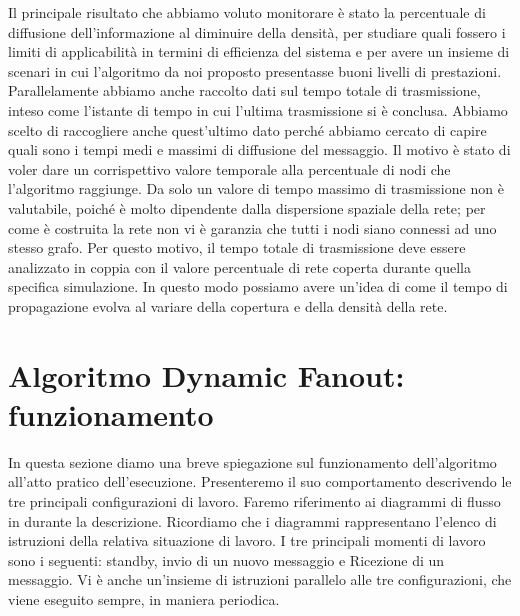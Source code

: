 Il principale risultato che abbiamo voluto monitorare è stato la percentuale di diffusione dell'informazione al diminuire della densità, per studiare quali fossero i limiti di applicabilità in termini di efficienza del sistema e per avere un insieme di scenari in cui l'algoritmo da noi proposto presentasse buoni livelli di prestazioni. Parallelamente abbiamo anche raccolto dati sul tempo totale di trasmissione, inteso come l'istante di tempo in cui l'ultima trasmissione si è conclusa. Abbiamo scelto di raccogliere anche quest'ultimo dato perché abbiamo cercato di capire quali sono i tempi medi e massimi di diffusione del messaggio. Il motivo è stato di voler dare un corrispettivo valore temporale alla percentuale di nodi che l'algoritmo raggiunge. Da solo un valore di tempo massimo di trasmissione non è valutabile, poiché è molto dipendente dalla dispersione spaziale della rete; per come è costruita la rete non vi è garanzia che tutti i nodi siano connessi ad uno stesso grafo. Per questo motivo, il tempo totale di trasmissione deve essere analizzato in coppia con il valore percentuale di rete coperta durante quella specifica simulazione. In questo modo possiamo avere un'idea di come il tempo di propagazione evolva al variare della copertura e della densità della rete.
\bigskip

\section{Algoritmo Dynamic Fanout: funzionamento}
In questa sezione diamo una breve spiegazione sul funzionamento dell'algoritmo all'atto pratico dell'esecuzione. Presenteremo il suo comportamento descrivendo le tre principali configurazioni di lavoro. Faremo riferimento ai diagrammi di flusso in  durante la descrizione. Ricordiamo che i diagrammi rappresentano l'elenco di istruzioni della relativa situazione di lavoro. I tre principali momenti di lavoro sono i seguenti: standby, invio di un nuovo messaggio e Ricezione di un messaggio. Vi è anche un'insieme di istruzioni parallelo alle tre configurazioni, che viene eseguito sempre, in maniera periodica.
\bigskip

